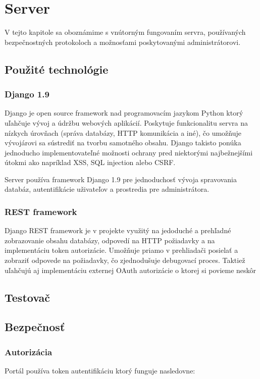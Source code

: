 \chapter{Server}

\label{kap:server}

V tejto kapitole sa oboznámime s vnútorným fungovaním servra, používaných bezpečnostných protokoloch
a možnosťami poskytovanými administrátorovi.

\section{Použité technológie}

\subsection{Django 1.9}
Django je open source framework nad programovacím jazykom Python ktorý uľahčuje vývoj a údržbu webových aplikácií.
Poskytuje funkcionalitu servra na nízkych úrovňach (správa databázy, HTTP komunikácia a iné), čo umožňuje vývojárovi sa sústrediť na tvorbu samotného obsahu.
Django takisto ponúka jednoducho implementovateľné možnosti ochrany pred niektorými najbežnejšími útokmi ako napríklad XSS, SQL injection alebo CSRF.

Server používa framework Django 1.9 pre jednoduchosť vývoja spravovania databáz, autentifikácie uživateľov a prostredia pre administrátora.
\subsection{REST framework}
Django REST framework je v projekte využitý na jedoduché a prehľadné zobrazovanie obsahu databázy, odpovedí na HTTP požiadavky a na implementáciu
token autorizácie. Umožňuje priamo v prehliadači posielať a zobraziť odpovede na požiadavky, čo zjednodušuje debugovací proces. Taktiež uľahčujú aj implementáciu externej OAuth
autorizácie o ktorej si povieme neskôr

\section{Testovač}
\section{Bezpečnosť}
\subsection{Autorizácia}
Portál používa token autentifikáciu ktorý funguje nasledovne:

